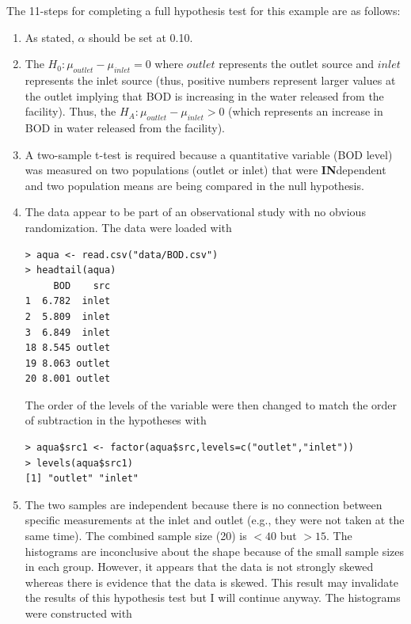 \documentclass[10pt,openany]{book}\usepackage[]{graphicx}\usepackage[]{color}
\makeatletter
\newenvironment{kframe}{%
 \def\at@end@of@kframe{}%
 \ifinner\ifhmode%
  \def\at@end@of@kframe{\end{minipage}}%
  \begin{minipage}{\columnwidth}%
 \fi\fi%
 \def\FrameCommand##1{\hskip\@totalleftmargin \hskip-\fboxsep
 \colorbox{shadecolor}{##1}\hskip-\fboxsep
     \hskip-\linewidth \hskip-\@totalleftmargin \hskip\columnwidth}%
 \MakeFramed {\advance\hsize-\width
   \@totalleftmargin\z@ \linewidth\hsize
   \@setminipage}}%
 {\par\unskip\endMakeFramed%
 \at@end@of@kframe}
\newenvironment{knitrout}{}{} %
\makeatother
\begin{document}
The 11-steps  for completing a full hypothesis test for this example are as follows:
  \begin{enumerate}
    \item As stated, $\alpha$ should be set at 0.10.
    \item The $H_{0}:\mu_{outlet}-\mu_{inlet}=0$ where $outlet$ represents the outlet source and $inlet$ represents the inlet source (thus, positive numbers represent larger values at the outlet implying that BOD is increasing in the water released from the facility).  Thus, the $H_{A}:\mu_{outlet}-\mu_{inlet}>0$ (which represents an increase in BOD in water released from the facility).
    \item A two-sample t-test is required because a quantitative variable (BOD level) was measured on two populations (outlet or inlet) that were \textbf{IN}dependent and two population means are being compared in the null hypothesis.
    \item The data appear to be part of an observational study with no obvious randomization.  The data were loaded with
\begin{knitrout}
\color{fgcolor}\begin{kframe}
\begin{verbatim}
> aqua <- read.csv("data/BOD.csv")
> headtail(aqua)
     BOD    src
1  6.782  inlet
2  5.809  inlet
3  6.849  inlet
18 8.545 outlet
19 8.063 outlet
20 8.001 outlet
\end{verbatim}
\end{kframe}
\end{knitrout}
The order of the levels of the  variable were then changed to match the order of subtraction in the hypotheses with
\begin{knitrout}
\color{fgcolor}\begin{kframe}
\begin{verbatim}
> aqua$src1 <- factor(aqua$src,levels=c("outlet","inlet"))
> levels(aqua$src1)
[1] "outlet" "inlet" 
\end{verbatim}
\end{kframe}
\end{knitrout}
    \item The two samples are independent because there is no connection between specific measurements at the inlet and outlet (e.g., they were not taken at the same time). The combined sample size (20) is $<40$ but $>15$.  The histograms  are inconclusive about the shape because of the small sample sizes in each group.  However, it appears that the  data is not strongly skewed whereas there is evidence that the  data is skewed.  This result may invalidate the results of this hypothesis test but I will continue anyway.  The histograms were constructed with

\end{enumerate}
\end{document}
